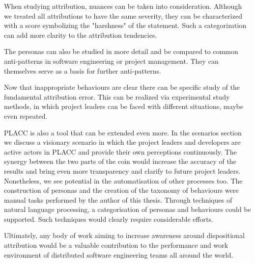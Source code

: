 When studying attribution, nuances can be taken into consideration.  Although we treated all attributions to have the same severity, they can be characterized with a score symbolizing the "harshness" of the statement. Such a categorization can add more clarity to the attribution tendencies.

The personas can also be studied in more detail and be compared to common anti-patterns in software engineering or project management. They can themselves serve as a basis for further anti-patterns. 

Now that inappropriate behaviours are clear there can be specific study of the fundamental attribution error. This can be realized via experimental study methods, in which project leaders can be faced with different situations,  maybe even repeated. 


PLACC is also a tool that can be extended even more.  In the scenarios section we discuss a visionary scenario in which the project leaders and developers are active actors in PLACC and provide their own perceptions continuously.  The synergy between the two parts of the coin would increase the accuracy of the results and bring even more transparency and clarify to future project leaders.  Nonetheless, we see potential in the automatisation of other processes too.  The construction of personas and the creation of the taxonomy of behaviours were manual tasks performed by the author of this thesis. Through techniques of natural language processing, a categorisation of personas and behaviours could be supported. Such techniques would clearly require considerable efforts.

Ultimately, any body of work aiming to increase awareness around dispositional attribution would be a valuable contribution to the performance and work environment of distributed software engineering teams all around the world.
